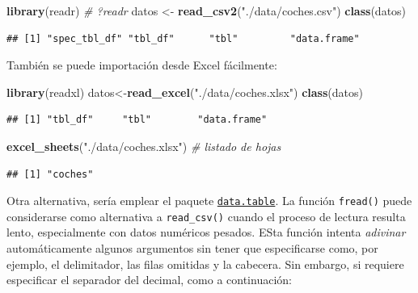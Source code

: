 \documentclass[
]{book}
\newenvironment{Shaded}{\begin{snugshade}}{\end{snugshade}}
\newcommand{\CommentTok}[1]{\textcolor[rgb]{0.56,0.35,0.01}{\textit{#1}}}
\newcommand{\FunctionTok}[1]{\textcolor[rgb]{0.13,0.29,0.53}{\textbf{#1}}}
\newcommand{\NormalTok}[1]{#1}
\newcommand{\OtherTok}[1]{\textcolor[rgb]{0.56,0.35,0.01}{#1}}
\newcommand{\StringTok}[1]{\textcolor[rgb]{0.31,0.60,0.02}{#1}}
\begin{document}
\begin{Shaded}
\begin{Highlighting}[]
\FunctionTok{library}\NormalTok{(readr)}
\CommentTok{\# ?readr}
\NormalTok{datos }\OtherTok{\textless{}{-}} \FunctionTok{read\_csv2}\NormalTok{(}\StringTok{"./data/coches.csv"}\NormalTok{)}
\FunctionTok{class}\NormalTok{(datos) }
\end{Highlighting}
\end{Shaded}

\begin{verbatim}
## [1] "spec_tbl_df" "tbl_df"      "tbl"         "data.frame"
\end{verbatim}

También se puede importación desde Excel fácilmente:

\begin{Shaded}
\begin{Highlighting}[]
\FunctionTok{library}\NormalTok{(readxl)}
\NormalTok{datos}\OtherTok{\textless{}{-}}\FunctionTok{read\_excel}\NormalTok{(}\StringTok{"./data/coches.xlsx"}\NormalTok{)}
\FunctionTok{class}\NormalTok{(datos)}
\end{Highlighting}
\end{Shaded}

\begin{verbatim}
## [1] "tbl_df"     "tbl"        "data.frame"
\end{verbatim}

\begin{Shaded}
\begin{Highlighting}[]
\FunctionTok{excel\_sheets}\NormalTok{(}\StringTok{"./data/coches.xlsx"}\NormalTok{) }\CommentTok{\# listado de hojas}
\end{Highlighting}
\end{Shaded}

\begin{verbatim}
## [1] "coches"
\end{verbatim}

Otra alternativa, sería emplear el paquete \href{https://r-datatable.com}{\texttt{data.table}}.
La función \texttt{fread()} puede considerarse como alternativa a \texttt{read\_csv()}
cuando el proceso de lectura resulta lento, especialmente con datos numéricos pesados. ESta función intenta \emph{adivinar} automáticamente algunos argumentos sin tener que especificarse como, por ejemplo, el delimitador, las filas omitidas y la cabecera. Sin embargo, si requiere especificar el separador del decimal, como a continuación:
\end{document}
